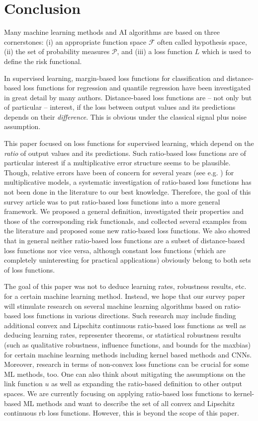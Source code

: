 \documentclass[10pt]{article}
\begin{document}
	
\section{Conclusion}
Many machine learning methods and AI algorithms are based on three cornerstones: (i) an appropriate function space  $\mathcal{F}$ often called hypothesis space, (ii) the set of  probability measures $\mathcal{P}$, and (iii) a loss function $L$ which is used to define the risk functional. \par
In supervised learning, margin-based loss functions for classification and distance-based loss functions for regression and quantile regression have been investigated in great detail by many authors. Distance-based loss functions are -- not only but of particular -- interest, if the loss between output values and its predictions depends on their \emph{difference}. 
This is obvious under the classical signal plus noise assumption.\par 
This paper focused on loss functions for supervised learning,
which depend on the \emph{ratio} of output values and its predictions. 
Such ratio-based loss functions are of particular interest if a multiplicative error structure seems to be plausible. 
Though, relative errors have been of concern for several years (see e.g. \cite{ChenEtAl2010LARE, ChenEtAl2016LPRE, JadonEtAl2022, TervenEtAl2025}) for multiplicative models, a systematic investigation of ratio-based loss functions has not been done in the literature to our best knowledge.
Therefore, the goal of this survey article was to put ratio-based loss functions into a more general framework.
We proposed a general definition, investigated their properties and those of the corresponding risk functionals, and collected several examples from the literature and proposed some new ratio-based loss functions.
We also showed that in general neither ratio-based loss functions are a subset of distance-based loss functions nor vice versa, although constant loss functions (which are completely uninteresting for practical applications) obviously belong to both sets of loss functions.\par
The goal of this paper was not to deduce learning rates, robustness results, etc. for a certain machine learning method.
Instead, we hope that our survey paper will stimulate research on several machine learning algorithms based on ratio-based loss functions in various directions.  
Such research may include finding additional convex and Lipschitz continuous ratio-based loss functions as well as deducing learning rates, representer theorems, or statistical robustness results (such as qualitative robustness, influence functions, and bounds for the maxbias) for certain machine learning methods including kernel based methods and CNNs.
Moreover, research in terms of non-convex loss functions can be crucial for some ML methods, too.
One can also think about mitigating the assumptions on the link function $u$ as well as expanding the ratio-based definition to other output spaces.
We are currently focusing on applying ratio-based loss functions to kernel-based ML methods and want to describe the set of all convex and Lipschitz continuous rb loss functions.
However, this is beyond the scope of this paper.  
\end{document}
